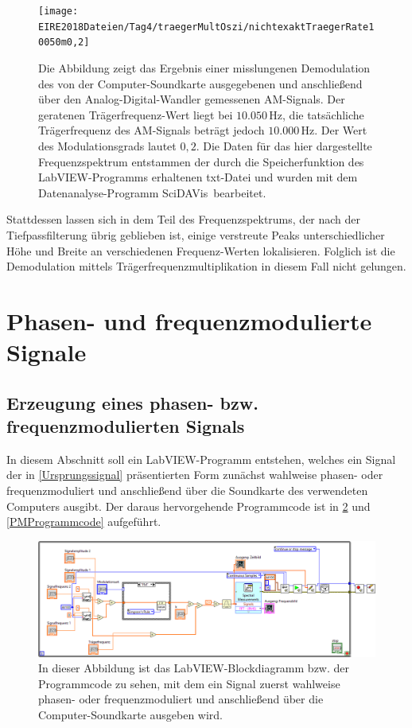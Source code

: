 \documentclass[
a4paper,
12pt,
pagesize,
ngerman
]{scrartcl}
\begin{document}
	\begin{figure}[H]
		\centering
		\texttt{[image: EIRE2018Dateien/Tag4/traegerMultOszi/nichtexaktTraegerRate10050m0,2]}
		\caption{Die Abbildung zeigt das Ergebnis einer misslungenen Demodulation des von der Computer-Soundkarte ausgegebenen und anschließend über den Analog-Digital-Wandler gemessenen AM-Signals. Der geratenen Trägerfrequenz-Wert liegt bei $10.050\,$Hz, die tatsächliche Trägerfrequenz des AM-Signals beträgt jedoch $10.000\,$Hz. Der Wert des Modulationsgrads lautet $0,2$. Die Daten für das hier dargestellte Frequenzspektrum entstammen der durch die Speicherfunktion des LabVIEW-Programms erhaltenen txt-Datei und wurden mit dem Datenanalyse-Programm \glqq SciDAVis\grqq\ bearbeitet.}
		\label{AMDemodfailm02}
	\end{figure}

	\noindent Stattdessen lassen sich in dem Teil des Frequenzspektrums, der nach der Tiefpassfilterung übrig geblieben ist, einige verstreute Peaks unterschiedlicher Höhe und Breite an verschiedenen Frequenz-Werten lokalisieren.
	Folglich ist die Demodulation mittels Trägerfrequenzmultiplikation in diesem Fall nicht gelungen.
	
	\newpage
	
	
	\section{Phasen- und frequenzmodulierte Signale}

	\subsection{Erzeugung eines phasen- bzw. frequenzmodulierten Signals} \label{FMPMErzeugung} %
	
	In diesem Abschnitt soll ein LabVIEW-Programm entstehen, welches ein Signal der in \cref{Ursprungssignal} präsentierten Form zunächst wahlweise phasen- oder frequenzmoduliert und anschließend über die Soundkarte des verwendeten Computers ausgibt. 
	Der daraus hervorgehende Programmcode ist in \cref{FMProgrammcode} und \cref{PMProgrammcode} aufgeführt.
	
	\begin{figure}[H]
		\centering
		\includegraphics[width=1.0\textwidth]{EIRE2018Dateien/Tag4/FMPM-Erzeugung/FMPM-Erzeugungd}
		\caption{In dieser Abbildung ist das LabVIEW-Blockdiagramm bzw. der Programmcode zu sehen, mit dem ein Signal zuerst wahlweise phasen- oder frequenzmoduliert und anschließend über die Computer-Soundkarte ausgeben wird.}
		\label{FMProgrammcode}
	\end{figure}
	
\end{document}
